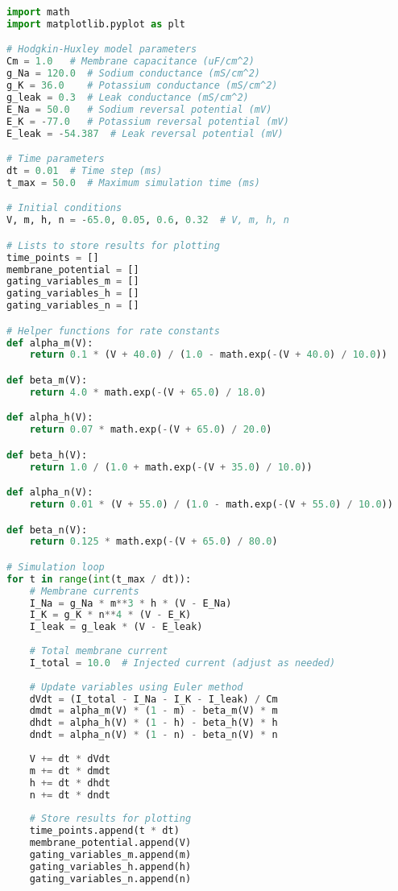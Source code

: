 \begin{lstlisting}[language=Python, caption={Full implementation of a Hodkin-Huxley neuron}, label={lst:Hodkin-Huxley}]
import math
import matplotlib.pyplot as plt

# Hodgkin-Huxley model parameters
Cm = 1.0   # Membrane capacitance (uF/cm^2)
g_Na = 120.0  # Sodium conductance (mS/cm^2)
g_K = 36.0    # Potassium conductance (mS/cm^2)
g_leak = 0.3  # Leak conductance (mS/cm^2)
E_Na = 50.0   # Sodium reversal potential (mV)
E_K = -77.0   # Potassium reversal potential (mV)
E_leak = -54.387  # Leak reversal potential (mV)

# Time parameters
dt = 0.01  # Time step (ms)
t_max = 50.0  # Maximum simulation time (ms)

# Initial conditions
V, m, h, n = -65.0, 0.05, 0.6, 0.32  # V, m, h, n

# Lists to store results for plotting
time_points = []
membrane_potential = []
gating_variables_m = []
gating_variables_h = []
gating_variables_n = []

# Helper functions for rate constants
def alpha_m(V):
	return 0.1 * (V + 40.0) / (1.0 - math.exp(-(V + 40.0) / 10.0))

def beta_m(V):
	return 4.0 * math.exp(-(V + 65.0) / 18.0)

def alpha_h(V):
	return 0.07 * math.exp(-(V + 65.0) / 20.0)

def beta_h(V):
	return 1.0 / (1.0 + math.exp(-(V + 35.0) / 10.0))

def alpha_n(V):
	return 0.01 * (V + 55.0) / (1.0 - math.exp(-(V + 55.0) / 10.0))

def beta_n(V):
	return 0.125 * math.exp(-(V + 65.0) / 80.0)

# Simulation loop
for t in range(int(t_max / dt)):
	# Membrane currents
	I_Na = g_Na * m**3 * h * (V - E_Na)
	I_K = g_K * n**4 * (V - E_K)
	I_leak = g_leak * (V - E_leak)
	
	# Total membrane current
	I_total = 10.0  # Injected current (adjust as needed)
	
	# Update variables using Euler method
	dVdt = (I_total - I_Na - I_K - I_leak) / Cm
	dmdt = alpha_m(V) * (1 - m) - beta_m(V) * m
	dhdt = alpha_h(V) * (1 - h) - beta_h(V) * h
	dndt = alpha_n(V) * (1 - n) - beta_n(V) * n
	
	V += dt * dVdt
	m += dt * dmdt
	h += dt * dhdt
	n += dt * dndt
	
	# Store results for plotting
	time_points.append(t * dt)
	membrane_potential.append(V)
	gating_variables_m.append(m)
	gating_variables_h.append(h)
	gating_variables_n.append(n)

\end{lstlisting}
